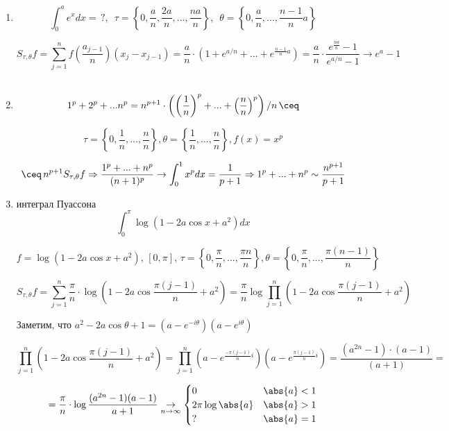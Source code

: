 \begin{example}
    \begin{enumerate}
        \item \[
            \int_0^{a} e^x dx = \,? , \,\,\, \tau = \left\{ 0, \frac{a}{n}, \frac{2a}{n}, ..., \frac{na}{n} \right\}, \,\,\, \theta = \left\{ 0, \frac{a}{n}, ... , \frac{n - 1}{n} a \right\}
        \]
    
        \[
            S_{\tau, \theta} f = \sum_{j = 1}^n f \left( \frac{a_{j - 1}}{n} \right)(x_j - x_{j - 1}) = \frac{a}{n} \cdot \left( 1 + e ^ {a / n} + ... + e ^{\frac{n - 1}{n} a} \right) = \frac{a}{n} \cdot \frac{e ^ {\frac{na}{n}} - 1}{e ^ {a / n} - 1} \to e^a - 1
        \]
        \\
        \item
        \[
            1 ^ p + 2 ^ p + ... n ^ p = n ^ {p + 1} \cdot \left( \left( \frac{1}{n} \right) ^ p + ... + \left( \frac{n}{n} \right) ^ p \right)/ n \, \ceq
        \]

        \[
            \tau = \left\{ 0, \frac{1}{n}, ... , \frac{n}{n} \right\}, \theta = \left\{\frac{1}{n}, ... , \frac{n}{n}  \right\}, f(x) = x ^ p
        \]

        \[
            \ceq \, n ^ {p + 1} S_{\tau, \theta} f \Rightarrow \frac{1 ^ p + ... + n ^ p}{(n + 1) ^ p} \to \int_0^1 x ^ p dx = \frac{1}{p + 1} \Rightarrow 1 ^ p + ... + n ^ p \sim \frac{n ^ {p + 1}}{p + 1}
        \]

        \item интеграл Пуассона
        \[
            \int_0^\pi \log{(1 - 2a \cos{x} + a ^ 2)} dx
        \]

        \[
            f = \log{(1 - 2a \cos{x} + a ^ 2)},\, [0, \pi],\, \tau = \left\{0, \frac{\pi}{n}, ... , \frac{\pi n}{n} \right\}, \theta = \left\{0, \frac{\pi}{n}, ... , \frac{\pi (n - 1)}{n} \right\}
        \]

        \[
            S_{\tau, \theta} f = \sum_{j = 1}^n \frac{\pi}{n} \cdot \log{(1 - 2a \cos{\frac{\pi (j - 1)}{n} + a ^ 2})} = \frac{\pi}{n} \log{\prod_{j = 1}^n (1 - 2a \cos{\frac{\pi (j - 1)}{n} + a ^ 2})}
        \]

        Заметим, что $a ^ 2 - 2a \cos{\theta} + 1 = (a - e ^ {-i \theta})(a - e ^ {i \theta})$

        \[
            \prod_{j = 1}^n (1 - 2a \cos{\frac{\pi (j - 1)}{n} + a ^ 2}) =  \prod_{j = 1}^n (a - e ^ {\frac{-\pi (j - 1)}{n} i })(a - e ^ {\frac{\pi (j - 1)}{n} i }) = \frac{(a ^ {2n} - 1) \cdot (a - 1)}{(a + 1)} =
        \]

        \[
            =\frac{\pi}{n} \cdot \log{\frac{(a ^ {2n} - 1)(a - 1)}{a + 1}} \underset{n \to \infty}{\to} \begin{cases}
                0 & \abs{a} < 1 \\
                2 \pi \log{\abs{a}} & \abs{a} > 1 \\
                ? & \abs{a} = 1
              \end{cases}
        \]
    \end{enumerate}
    
\end{example}


